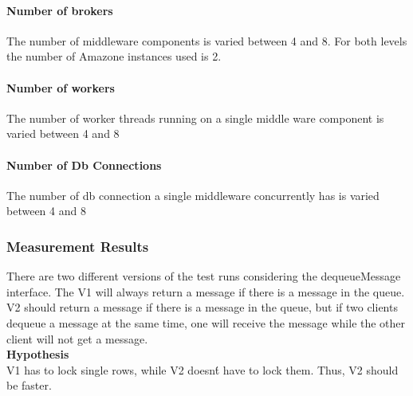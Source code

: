 \documentclass[milestone1.tex]{subfiles}
\begin{document}
\paragraph{Number of brokers}

The number of middleware components is varied between 4 and 8. For both levels the number of Amazone instances used is 2.

\paragraph{Number of workers}

The number of worker threads running on a single middle ware component is varied between 4 and 8

\paragraph{Number of Db Connections}

The number of db connection a single middleware concurrently has is varied between 4 and 8

\subsubsection{Measurement Results}

There are two different versions of the test runs considering the dequeueMessage interface. The V1 will always return a message if there is a message in the queue. V2 should return a message if there is a message in the queue, but if two clients dequeue a message at the same time, one will receive the message while the other client will not get a message.\\

\textbf{Hypothesis}\\

V1 has to lock single rows, while V2 doesn\'t have to lock them. Thus, V2 should be faster.\\
\end{document}
